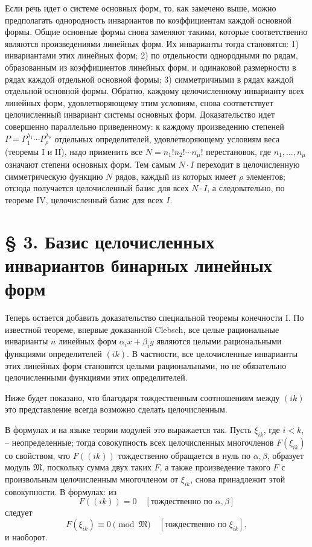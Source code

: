 \documentclass[11pt]{article}
\providecommand{\frM}{\mathfrak M}
\begin{document}
Если речь идет о системе основных форм, то, как замечено выше, можно предполагать однородность инвариантов по коэффициентам каждой основной формы. Общие основные формы снова заменяют такими, которые соответственно являются произведениями линейных форм. Их инварианты тогда становятся: 1) инвариантами этих линейных форм; 2) по отдельности однородными по рядам, образованным из коэффициентов линейных форм, и одинаковой размерности в рядах каждой отдельной основной формы; 3) симметричными в рядах каждой отдельной основной формы. Обратно, каждому целочисленному инварианту всех линейных форм, удовлетворяющему этим условиям, снова соответствует целочисленный инвариант системы основных форм. Доказательство идет совершенно параллельно приведенному: к каждому произведению степеней \(P=P_1^{\lambda_1}\cdots P_\rho^{\lambda_\rho}\) отдельных определителей, удовлетворяющему условиям веса (теоремы I и II), надо применить все \(N=n_1!n_2!\cdots n_\mu!\) перестановок, где \(n_1,\ldots,n_\mu\) означают степени основных форм. Тем самым \(N\cdot I\) переходит в целочисленную симметрическую функцию \(N\) рядов, каждый из которых имеет \(\rho\) элементов; отсюда получается целочисленный базис для всех \(N\cdot I\), а следовательно, по теореме IV, целочисленный базис для всех \(I\).

\setcounter{equation}{0}
\section*{§ 3. Базис целочисленных инвариантов бинарных линейных форм}

Теперь остается добавить доказательство специальной теоремы конечности I. По известной теореме, впервые доказанной Clebsch, все целые рациональные инварианты \(n\) линейных форм \(\alpha_i x+\beta_i y\) являются целыми рациональными функциями определителей \((ik)\). В частности, все целочисленные инварианты этих линейных форм становятся целыми рациональными, но не обязательно целочисленными функциями этих определителей.

Ниже будет показано, что благодаря тождественным соотношениям между \((ik)\) это представление всегда возможно сделать целочисленным.

В формулах и на языке теории модулей это выражается так. Пусть \(\xi_{ik}\), где \(i<k\), -- неопределенные; тогда совокупность всех целочисленных многочленов \(F(\xi_{ik})\) со свойством, что \(F((ik))\) тождественно обращается в нуль по \(\alpha,\beta\), образует модуль \(\frM\), поскольку сумма двух таких \(F\), а также произведение такого \(F\) с произвольным целочисленным многочленом от \(\xi_{ik}\), снова принадлежит этой совокупности. В формулах: из
\[
        F((ik))=0\quad [\text{тождественно по \(\alpha,\beta\)}]
\]
следует
\[
        F(\xi_{ik})\equiv0\pmod{\frM}\quad [\text{тождественно по \(\xi_{ik}\)}],
\]
и наоборот.
\end{document}
